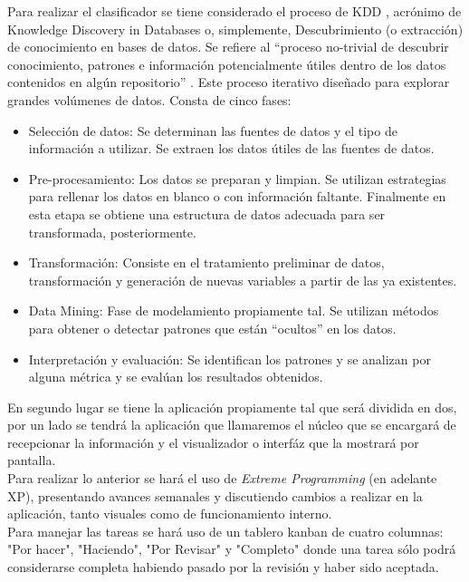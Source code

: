 Para realizar el clasificador se tiene considerado el proceso de KDD \cite{KDDFayyad}, acrónimo de Knowledge Discovery in Databases o, simplemente, Descubrimiento (o extracción) de conocimiento en bases de datos. Se refiere al “proceso no-trivial de descubrir conocimiento, patrones e información potencialmente útiles dentro de los datos contenidos en algún repositorio” \cite{KDDDefinicion}. Este proceso iterativo diseñado para explorar grandes volúmenes de datos. Consta de cinco fases:\\

\begin{itemize}
\item	Selección de datos: Se determinan las fuentes de datos y el tipo de información a utilizar. Se extraen los datos útiles de las fuentes de datos.
\item	Pre-procesamiento: Los datos se preparan y limpian. Se utilizan estrategias para rellenar los datos en blanco o con información faltante. Finalmente en esta etapa se obtiene una estructura de datos adecuada para ser transformada, posteriormente.
\item	Transformación: Consiste en el tratamiento preliminar de datos, transformación y generación de nuevas variables a partir de las ya existentes. 
\item	Data Mining: Fase de modelamiento propiamente tal. Se utilizan métodos para obtener o detectar patrones que están “ocultos” en los datos.
\item	Interpretación y evaluación: Se identifican los patrones y se analizan por alguna métrica y se evalúan los resultados obtenidos.
\end{itemize}

En segundo lugar se tiene la aplicación propiamente tal que será dividida en dos, por un lado se tendrá la aplicación que llamaremos el núcleo que se encargará de recepcionar la información y el visualizador o interfáz que la mostrará por pantalla.\\

Para realizar lo anterior se hará el uso de \textit{Extreme Programming} (en adelante XP), presentando avances semanales y discutiendo cambios a realizar en la aplicación, tanto visuales como de funcionamiento interno.\\

Para manejar las tareas se hará uso de un tablero kanban de cuatro columnas: "Por hacer", "Haciendo", "Por Revisar" y "Completo" donde una tarea sólo podrá considerarse completa habiendo pasado por la revisión y haber sido aceptada.

